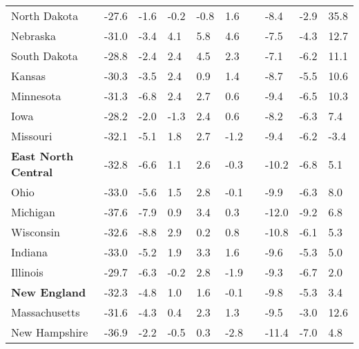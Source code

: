 {\begin{tabular}{p{30mm} R{7mm} R{7mm} R{7mm} R{7mm} 
             R{7mm} p{0mm} R{9mm} R{9mm} R{10mm} }
\hspace{3mm}  North Dakota  & -27.6 & -1.6 & -0.2 & -0.8 & 1.6 &  & -8.4 & -2.9 & 35.8 \\
\hspace{3mm}  Nebraska  & -31.0 & -3.4 & 4.1 & 5.8 & 4.6 &  & -7.5 & -4.3 & 12.7 \\
\hspace{3mm}  South Dakota  & -28.8 & -2.4 & 2.4 & 4.5 & 2.3 &  & -7.1 & -6.2 & 11.1 \\
\hspace{3mm}  Kansas  & -30.3 & -3.5 & 2.4 & 0.9 & 1.4 &  & -8.7 & -5.5 & 10.6 \\
\hspace{3mm}  Minnesota  & -31.3 & -6.8 & 2.4 & 2.7 & 0.6 &  & -9.4 & -6.5 & 10.3 \\
\hspace{3mm}  Iowa  & -28.2 & -2.0 & -1.3 & 2.4 & 0.6 &  & -8.2 & -6.3 & 7.4 \\
\hspace{3mm}  Missouri  & -32.1 & -5.1 & 1.8 & 2.7 & -1.2 &  & -9.4 & -6.2 & -3.4 \\
\hspace{1mm} \textbf{East North Central}  & -32.8 & -6.6 & 1.1 & 2.6 & -0.3 &  & -10.2 & -6.8 & 5.1 \\
\hspace{3mm}  Ohio  & -33.0 & -5.6 & 1.5 & 2.8 & -0.1 &  & -9.9 & -6.3 & 8.0 \\
\hspace{3mm}  Michigan  & -37.6 & -7.9 & 0.9 & 3.4 & 0.3 &  & -12.0 & -9.2 & 6.8 \\
\hspace{3mm}  Wisconsin  & -32.6 & -8.8 & 2.9 & 0.2 & 0.8 &  & -10.8 & -6.1 & 5.3 \\
\hspace{3mm}  Indiana  & -33.0 & -5.2 & 1.9 & 3.3 & 1.6 &  & -9.6 & -5.3 & 5.0 \\
\hspace{3mm}  Illinois  & -29.7 & -6.3 & -0.2 & 2.8 & -1.9 &  & -9.3 & -6.7 & 2.0 \\
\hspace{1mm} \textbf{New England}  & -32.3 & -4.8 & 1.0 & 1.6 & -0.1 &  & -9.8 & -5.3 & 3.4 \\
\hspace{3mm}  Massachusetts  & -31.6 & -4.3 & 0.4 & 2.3 & 1.3 &  & -9.5 & -3.0 & 12.6 \\
\hspace{3mm}  New Hampshire  & -36.9 & -2.2 & -0.5 & 0.3 & -2.8 &  & -11.4 & -7.0 & 4.8 \\

\end{tabular}}
